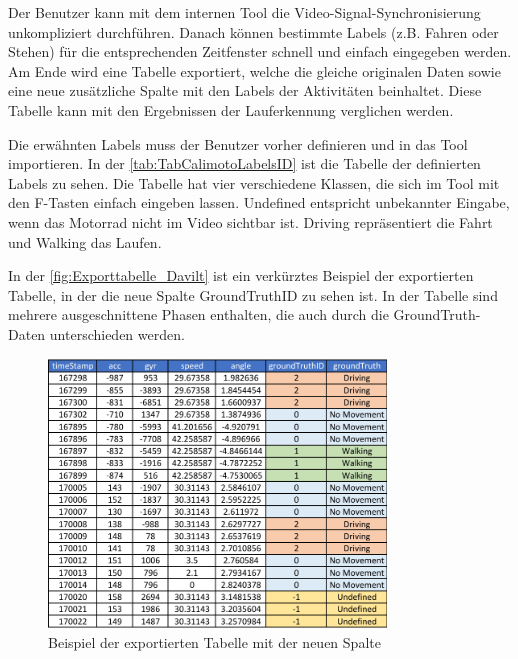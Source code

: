 Der Benutzer kann mit dem internen Tool die Video-Signal-Synchronisierung unkompliziert durchführen. Danach können bestimmte Labels (z.B. Fahren oder Stehen) für die entsprechenden Zeitfenster schnell und einfach eingegeben werden. Am Ende wird eine Tabelle exportiert, welche die gleiche originalen Daten sowie eine neue zusätzliche Spalte mit den Labels der Aktivitäten beinhaltet.
Diese Tabelle kann mit den Ergebnissen der Lauferkennung verglichen werden.

Die erwähnten Labels muss der Benutzer vorher definieren und in das Tool importieren. In der \autoref{tab:TabCalimotoLabelsID} ist die Tabelle der definierten Labels zu sehen. Die Tabelle hat vier verschiedene Klassen, die sich im Tool mit den F-Tasten einfach eingeben lassen. \glqq Undefined\grqq{} entspricht unbekannter Eingabe, wenn das Motorrad nicht im Video sichtbar ist. \glqq Driving\grqq{} repräsentiert die Fahrt und \glqq Walking\grqq{} das Laufen.
 
In der \autoref{fig:Exporttabelle_Davilt} ist ein verkürztes Beispiel der exportierten Tabelle, in der die neue Spalte \glqq GroundTruthID\grqq{} zu sehen ist. In der Tabelle sind mehrere ausgeschnittene Phasen enthalten, die auch durch die GroundTruth-Daten unterschieden werden.
\begin{figure}[htpb]
	\centering
	\includegraphics[width=0.8\textwidth]{Bilder/GriundTruthTabelle.pdf}
	\caption{Beispiel der exportierten Tabelle mit der neuen Spalte}
	\label{fig:Exporttabelle_Davilt}
\end{figure}


